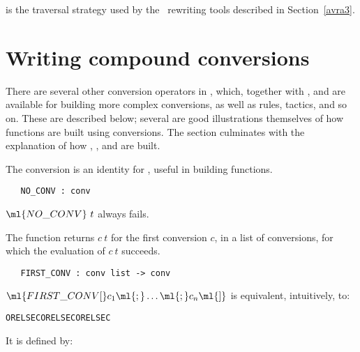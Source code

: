  is the traversal
strategy used by the \HOL\ rewriting tools described in Section~\ref{avra3}.

\section{Writing compound conversions}
\label{avra2}

There are several other conversion operators in \HOL, which,
together with ,  and  are available
for building more complex conversions, as well as rules, tactics, and so on.
These are described below; several are good illustrations themselves
of how functions are built using conversions. The section culminates
with the explanation of how , , and
 are built.

The conversion  is an identity for
, useful
in building functions.

\begin{holboxed}
\begin{verbatim}
   NO_CONV : conv
\end{verbatim}\end{holboxed}

\noindent $\ml{NO\_CONV}\ t$ always fails.

The function 
returns $c\ t$ for the first conversion $c$, in a list of conversions,
for which the evaluation of $c\ t$ succeeds.

\begin{holboxed}
\begin{verbatim}
   FIRST_CONV : conv list -> conv
\end{verbatim}\end{holboxed}

\noindent $\ml{FIRST\_CONV [}c_1\ml{;}\ldots\ml{;}c_n\ml{]}$ is equivalent,
intuitively, to:

\begin{hol}
\begin{alltt}
    ORELSEC  ORELSEC \m{\ldots} ORELSEC 
\end{alltt}\end{hol}

\noindent It is defined by:

